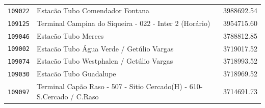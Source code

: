\begin{table}[htb]
\begin{tabular}{p{1.0cm}p{9.0cm}p{3.0cm} }
        \texttt{109022} &                                                             Estacão Tubo Comendador Fontana  & 3988692.54 \\
        \texttt{109125} &                                      Terminal Campina do Siqueira - 022 - Inter 2 (Horário)  & 3954715.60 \\
        \texttt{109046} &                                                                         Estacão Tubo Merces  & 3788812.85 \\
        \texttt{109002} &                                                    Estacão Tubo Água Verde / Getúlio Vargas  & 3719017.52 \\
        \texttt{109074} &                                                    Estacão Tubo Westphalen / Getúlio Vargas  & 3718993.52 \\
        \texttt{109030} &                                                                      Estacão Tubo Guadalupe  & 3718969.52 \\
        \texttt{109097} &                       Terminal Capão Raso - 507 - Sitio Cercado(H) - 610-S.Cercado / C.Raso  & 3714691.73 \\
        \hline  
    \end{tabular}
\end{table}


   


